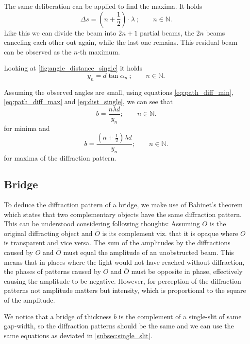 The same deliberation can be applied to find the maxima.
It holds
\begin{equation}\label{eq:path_diff_max}
	\Delta s = \left(n+\frac{1}{2}\right)\cdot\lambda\ ;\qquad n\in\mathbb{N}.
\end{equation}
Like this we can divide the beam into $2n+1$ partial beams, the $2n$ beams canceling each other out again, while the last one remains.
This residual beam can be observed as the $n$-th maximum.

Looking at \autoref{fig:angle_distance_single} it holds
\begin{equation}\label{eq:dist_single}
	y_n = d\tan\alpha_n\ ;\qquad n\in\mathbb{N}.
\end{equation}

Assuming the observed angles are small, using equations \ref{eq:path_diff_min}, \ref{eq:path_diff_max} and \ref{eq:dist_single}, we can see that
\begin{equation}\label{eq:single_slit_minima}
	b = \frac{n\lambda d}{y_n} ;\qquad n\in\mathbb{N}.
\end{equation}
for minima and
\begin{equation}\label{eq:single_slit_maxima}
	b = \frac{\left(n+\frac{1}{2}\right)\lambda d}{y_n} ;\qquad n\in\mathbb{N}.
\end{equation}
for maxima of the diffraction pattern.

\subsection{Bridge}\label{subsec:bridge}
To deduce the diffraction pattern of a bridge, we make use of Babinet's theorem which states that two complementary objects have the same diffraction pattern.
This can be understood considering following thoughts:
Assuming $O$ is the original diffracting object and $\bar{O}$ is its complement viz. that it is opaque where $O$ is transparent and vice versa.
The sum of the amplitudes by the diffractions caused by $O$ and $\bar{O}$ must equal the amplitude of an unobstructed beam.
This means that in places where the light would not have reached without diffraction, the phases of patterns caused by $O$ and $\bar{O}$ must be opposite in phase, effectively causing the amplitude to be negative.
However, for perception of the diffraction patterns not amplitude matters but intensity, which is proportional to the square of the amplitude.

We notice that a bridge of thickness $b$ is the complement of a single-slit of same gap-width, so the diffraction patterns should be the same and we can use the same equations as deviated in \autoref{subsec:single_slit}.

